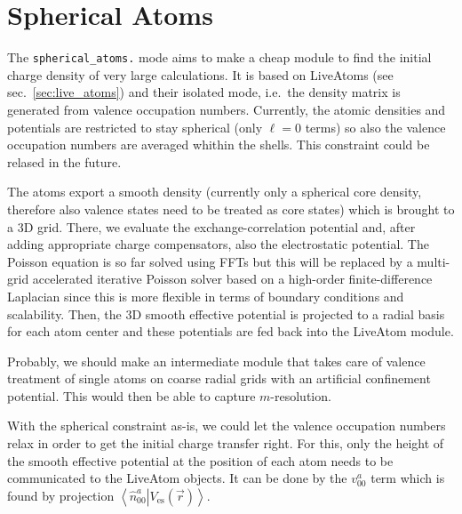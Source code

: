 \documentclass[oribibl]{llncs}
\newcommand{\um}[1]{_{\mathrm{#1}}}
\newcommand{\ttt}[1]{\texttt{#1}}
\newcommand{\braket}[2]{\left\langle \left. #1 \right| #2 \right\rangle}
\begin{document}
\section{Spherical Atoms} \label{sec:spherial-atoms}
%
The \ttt{spherical\_atoms.} mode aims to
make a cheap module to find the initial
charge density of very large calculations.
It is based on LiveAtoms (see sec.~\ref{sec:live_atoms})
and their isolated mode, i.e.~the density matrix is generated from valence occupation numbers.
Currently, the atomic densities and potentials are restricted to
stay spherical (only $\ell = 0$ terms) so
also the valence occupation numbers are averaged whithin the shells.
This constraint could be relased in the future.

The atoms export a smooth density (currently only a spherical core density, 
therefore also valence states need to be treated as core states)
which is brought to a 3D grid.
There, we evaluate the exchange-correlation potential and, after adding 
appropriate charge compensators, also the electrostatic potential.
The Poisson equation is so far solved using FFTs but this will be
replaced by a multi-grid accelerated iterative Poisson solver based on a
high-order finite-difference Laplacian since this is more flexible
in terms of boundary conditions and scalability.
Then, the 3D smooth effective potential is projected to a radial basis
for each atom center and these potentials are fed back into the LiveAtom module.

Probably, we should make an intermediate module that takes care of
valence treatment of single atoms on coarse radial grids with an artificial confinement potential.
This would then be able to capture $m$-resolution.

With the spherical constraint as-is,
we could let the valence occupation numbers relax 
in order to get the initial charge transfer right.
For this, only the height of the smooth effective potential at
the position of each atom needs to be communicated to the LiveAtom objects.
It can be done by the $v^a_{00}$ term which is found by projection 
$\braket{\hat n^a_{00}}{V\um{es}(\vec r)}$.
\end{document}
